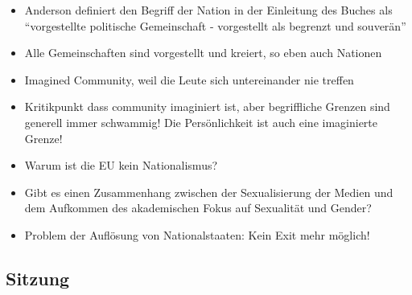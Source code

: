 \documentclass[emulatestandardclasses]{scrartcl}
\begin{document}
\begin{itemize}
  \item Anderson definiert den Begriff der Nation in der Einleitung des Buches als "`vorgestellte politische Gemeinschaft - vorgestellt als begrenzt und souverän"'
  \item Alle Gemeinschaften sind vorgestellt und kreiert, so eben auch Nationen
  \item Imagined Community, weil die Leute sich untereinander nie treffen
  \item Kritikpunkt dass community imaginiert ist, aber begriffliche Grenzen sind generell immer schwammig! Die Persönlichkeit ist auch eine imaginierte Grenze!
  \item Warum ist die EU kein Nationalismus?
  \item Gibt es einen Zusammenhang zwischen der Sexualisierung der Medien und dem Aufkommen des akademischen Fokus auf Sexualität und Gender?
  \item Problem der Auflösung von Nationalstaaten: Kein Exit mehr möglich!
\end{itemize}

\subsection{Sitzung}
\end{document}
